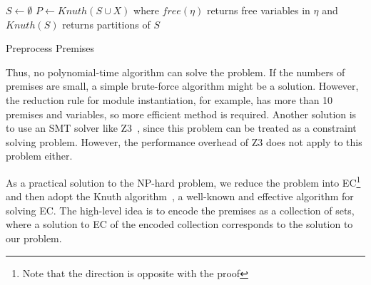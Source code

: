 \begin{algorithm}[t]
\DontPrintSemicolon
{}
$S \gets \emptyset$\;
$P \gets \mathit{Knuth}(S \cup X)$\;
where $\mathit{free}(\eta)$ returns free variables in $\eta$ and
$\mathit{Knuth}(S)$ returns partitions of $S$
\caption{Preprocess Premises}
\label{algo:preminfer}
\end{algorithm}

\medskip
Thus, no polynomial-time algorithm can solve the problem.
If the numbers of premises are small, a simple brute-force algorithm might be a solution.
However, the reduction rule for module instantiation, for example,
has more than 10 premises and variables, so more efficient method is required.
Another solution is to use an SMT solver like Z3~\cite{z3},
since this problem can be treated as a constraint solving problem.
However, the performance overhead of Z3 does not apply to this problem either.

As a practical solution to the NP-hard problem,
we reduce the problem into EC\footnote{Note that the direction is opposite with
the proof} and then adopt the Knuth algorithm~\cite{knuth2000dancing},
a well-known and effective algorithm for solving EC.
The high-level idea is to encode the premises as a collection of sets,
where a solution to EC of the encoded collection corresponds to the solution to our problem.

